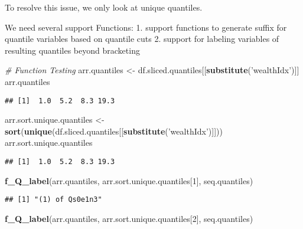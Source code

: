 \documentclass[
]{article}
\newenvironment{Shaded}{\begin{snugshade}}{\end{snugshade}}
\newcommand{\CommentTok}[1]{\textcolor[rgb]{0.56,0.35,0.01}{\textit{#1}}}
\newcommand{\DecValTok}[1]{\textcolor[rgb]{0.00,0.00,0.81}{#1}}
\newcommand{\KeywordTok}[1]{\textcolor[rgb]{0.13,0.29,0.53}{\textbf{#1}}}
\newcommand{\NormalTok}[1]{#1}
\newcommand{\StringTok}[1]{\textcolor[rgb]{0.31,0.60,0.02}{#1}}
\begin{document}
To resolve this issue, we only look at unique quantiles.

We need several support Functions: 1. support functions to generate
suffix for quantile variables based on quantile cuts 2. support for
labeling variables of resulting quantiles beyond bracketing

\begin{Shaded}
\begin{Highlighting}[]
\CommentTok{# Function Testing}
\NormalTok{arr.quantiles <-}\StringTok{ }\NormalTok{df.sliced.quantiles[[}\KeywordTok{substitute}\NormalTok{(}\StringTok{'wealthIdx'}\NormalTok{)]]}
\NormalTok{arr.quantiles}
\end{Highlighting}
\end{Shaded}

\begin{verbatim}
## [1]  1.0  5.2  8.3 19.3
\end{verbatim}

\begin{Shaded}
\begin{Highlighting}[]
\NormalTok{arr.sort.unique.quantiles <-}\StringTok{ }
\StringTok{  }\KeywordTok{sort}\NormalTok{(}\KeywordTok{unique}\NormalTok{(df.sliced.quantiles[[}\KeywordTok{substitute}\NormalTok{(}\StringTok{'wealthIdx'}\NormalTok{)]]))}
\NormalTok{arr.sort.unique.quantiles}
\end{Highlighting}
\end{Shaded}

\begin{verbatim}
## [1]  1.0  5.2  8.3 19.3
\end{verbatim}

\begin{Shaded}
\begin{Highlighting}[]
\KeywordTok{f_Q_label}\NormalTok{(arr.quantiles, arr.sort.unique.quantiles[}\DecValTok{1}\NormalTok{], seq.quantiles)}
\end{Highlighting}
\end{Shaded}

\begin{verbatim}
## [1] "(1) of Qs0e1n3"
\end{verbatim}

\begin{Shaded}
\begin{Highlighting}[]
\KeywordTok{f_Q_label}\NormalTok{(arr.quantiles, arr.sort.unique.quantiles[}\DecValTok{2}\NormalTok{], seq.quantiles)}
\end{Highlighting}
\end{Shaded}
\end{document}
